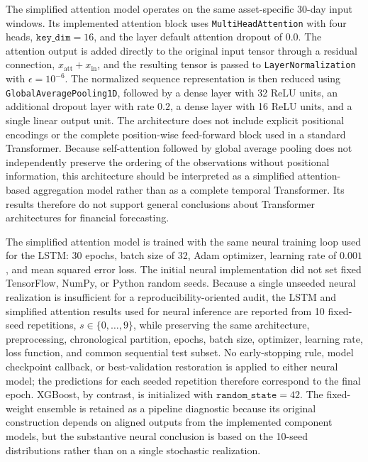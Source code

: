 \documentclass[utf8]{FrontiersinHarvard} %
\newcommand{\rev}[1]{{\color{red}#1}}
\begin{document}
The simplified attention model operates on the same asset-specific 30-day input windows. Its implemented attention block uses \texttt{MultiHeadAttention} with four heads, \(\texttt{key\_dim}=16\), and the layer default attention dropout of \(0.0\). The attention output is added directly to the original input tensor through a residual connection, \(x_{\mathrm{att}}+x_{\mathrm{in}}\), and the resulting tensor is passed to \texttt{LayerNormalization} with \(\epsilon=10^{-6}\). The normalized sequence representation is then reduced using \texttt{GlobalAveragePooling1D}, followed by a dense layer with 32 ReLU units, an additional dropout layer with rate \(0.2\), a dense layer with 16 ReLU units, and a single linear output unit. The architecture does not include explicit positional encodings or the complete position-wise feed-forward block used in a standard Transformer. Because self-attention followed by global average pooling does not independently preserve the ordering of the observations without positional information, this architecture should be interpreted as a simplified attention-based aggregation model rather than as a complete temporal Transformer. Its results therefore do not support general conclusions about Transformer architectures for financial forecasting.

The simplified attention model is trained with the same neural training loop used for the LSTM: 30 epochs, batch size of 32, Adam optimizer, learning rate of \(0.001\), and mean squared error loss. The initial neural implementation did not set fixed TensorFlow, NumPy, or Python random seeds. Because a single unseeded neural realization is insufficient for a reproducibility-oriented audit, \rev{the LSTM and simplified attention results used for neural inference are reported from 10 fixed-seed repetitions, \(s\in\{0,\ldots,9\}\), while preserving the same architecture, preprocessing, chronological partition, epochs, batch size, optimizer, learning rate, loss function, and common sequential test subset.} No early-stopping rule, model checkpoint callback, or best-validation restoration is applied to either neural model; the predictions for each seeded repetition therefore correspond to the final epoch. XGBoost, by contrast, is initialized with \(\texttt{random\_state}=42\). \rev{The fixed-weight ensemble is retained as a pipeline diagnostic because its original construction depends on aligned outputs from the implemented component models, but the substantive neural conclusion is based on the 10-seed distributions rather than on a single stochastic realization.}
\end{document}
